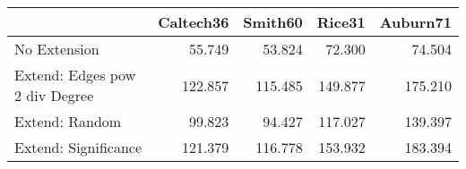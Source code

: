\begin{tabular}{lrrrr}
\toprule
{} & Caltech36 & Smith60 &  Rice31 & Auburn71 \\
\midrule
No Extension                   &    55.749 &  53.824 &  72.300 &   74.504 \\
Extend: Edges pow 2 div Degree &   122.857 & 115.485 & 149.877 &  175.210 \\
Extend: Random                 &    99.823 &  94.427 & 117.027 &  139.397 \\
Extend: Significance           &   121.379 & 116.778 & 153.932 &  183.394 \\
\bottomrule
\end{tabular}
